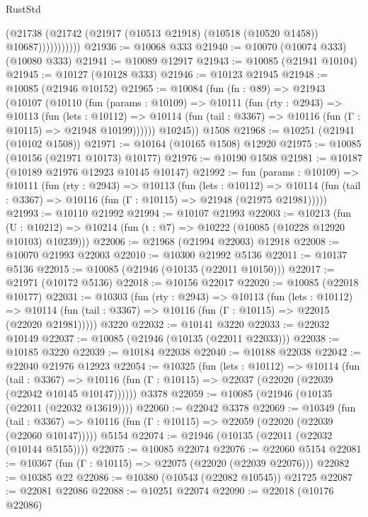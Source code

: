 \begin{lexlean}{RustStd}
\begin{coremodule}
                    (@21738
                      (@21742 (@21917 (@10513 @21918) (@10518 (@10520 @1458)) @10687)))))))))))
@21936 := @10068 @333
@21940 := @10070 (@10074 @333) (@10080 @333)
@21941 := @10089 @12917
@21943 := @10085 (@21941 @10104)
@21945 := @10127 (@10128 @333)
@21946 := @10123 @21945
@21948 := @10085 (@21946 @10152)
@21965 := @10084
    (fun (fn : @89) =>
    @21943
      (@10107
        (@10110
          (fun (params : @10109) =>
          @10111
            (fun (rty : @2943) =>
            @10113
              (fun (lets : @10112) =>
              @10114 (fun (tail : @3367) => @10116 (fun (Γ : @10115) => @21948 @10199))))))
        @10245))
    @1508
@21968 := @10251 (@21941 (@10102 @1508))
@21971 := @10164 (@10165 @1508) @12920
@21975 := @10085 (@10156 (@21971 @10173) @10177)
@21976 := @10190 @1508
@21981 := @10187 (@10189 @21976 @12923 @10145 @10147)
@21992 := fun (params : @10109) =>
  @10111
    (fun (rty : @2943) =>
    @10113
      (fun (lets : @10112) =>
      @10114 (fun (tail : @3367) => @10116 (fun (Γ : @10115) => @21948 (@21975 @21981)))))
@21993 := @10110 @21992
@21994 := @10107 @21993
@22003 := @10213
    (fun (U : @10212) => @10214 (fun (t : @7) => @10222 (@10085 (@10228 @12920 @10103) @10239)))
@22006 := @21968 (@21994 @22003) @12918
@22008 := @10070 @21993 @22003
@22010 := @10300 @21992 @5136
@22011 := @10137 @5136
@22015 := @10085 (@21946 (@10135 (@22011 @10150)))
@22017 := @21971 (@10172 @5136)
@22018 := @10156 @22017
@22020 := @10085 (@22018 @10177)
@22031 := @10303
    (fun (rty : @2943) =>
    @10113
      (fun (lets : @10112) =>
      @10114 (fun (tail : @3367) => @10116 (fun (Γ : @10115) => @22015 (@22020 @21981)))))
    @3220
@22032 := @10141 @3220
@22033 := @22032 @10149
@22037 := @10085 (@21946 (@10135 (@22011 @22033)))
@22038 := @10185 @3220
@22039 := @10184 @22038
@22040 := @10188 @22038
@22042 := @22040 @21976 @12923
@22054 := @10325
    (fun (lets : @10112) =>
    @10114
      (fun (tail : @3367) =>
      @10116 (fun (Γ : @10115) => @22037 (@22020 (@22039 (@22042 @10145 @10147))))))
    @3378
@22059 := @10085 (@21946 (@10135 (@22011 (@22032 @13619))))
@22060 := @22042 @3378
@22069 := @10349
    (fun (tail : @3367) => @10116 (fun (Γ : @10115) => @22059 (@22020 (@22039 (@22060 @10147)))))
    @5154
@22074 := @21946 (@10135 (@22011 (@22032 (@10144 @5155))))
@22075 := @10085 @22074
@22076 := @22060 @5154
@22081 := @10367 (fun (Γ : @10115) => @22075 (@22020 (@22039 @22076)))
@22082 := @10385 @22
@22086 := @10380 (@10543 (@22082 @10545)) @21725
@22087 := @22081 @22086
@22088 := @10251 @22074
@22090 := @22018 (@10176 @22086)

\end{coremodule}
\end{lexlean}
